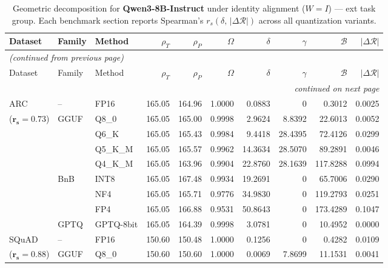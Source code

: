 \begingroup
\small
\setlength{\tabcolsep}{4pt}
\renewcommand{\arraystretch}{1.05}
\setlength{\LTcapwidth}{\textwidth}
\begin{longtable}{ll l rrrrrrr}
\caption{Geometric decomposition for \textbf{Qwen3-8B-Instruct} under identity alignment ($W{=}I$) --- ext task group. Each benchmark section reports Spearman's $r_s(\delta,\,|\Delta\mathcal{R}|)$ across all quantization variants.}\label{tab:qwen_instruct_decomposition_ext}\\
\toprule
Dataset & Family & Method & $\rho_T$ & $\rho_P$ & $\Omega$ & $\delta$ & $\gamma$ & $\mathcal{B}$ & $|\Delta\mathcal{R}|$ \\
\midrule
\endfirsthead
\multicolumn{10}{l}{\small\itshape (continued from previous page)}\\
\toprule
Dataset & Family & Method & $\rho_T$ & $\rho_P$ & $\Omega$ & $\delta$ & $\gamma$ & $\mathcal{B}$ & $|\Delta\mathcal{R}|$ \\
\midrule
\endhead
\midrule
\multicolumn{10}{r}{\small\itshape continued on next page}\\
\endfoot
\bottomrule
\endlastfoot
ARC & -- & FP16 & 165.05 & 164.96 & 1.0000 & 0.0883 & \cellcolor{cyan!12} $0$ & 0.3012 & 0.0025 \\
{\small ($\mathbf{r_s{=}0.73}$)} & GGUF & Q8\_0 & 165.05 & 165.00 & 0.9998 & 2.9624 & 8.8392 & 22.6013 & 0.0052 \\
 &  & Q6\_K & 165.05 & 165.43 & 0.9984 & 9.4418 & 28.4395 & 72.4126 & 0.0299 \\
 &  & Q5\_K\_M & 165.05 & 165.57 & 0.9962 & 14.3634 & 28.5070 & 89.2891 & 0.0046 \\
 &  & Q4\_K\_M & 165.05 & 163.96 & 0.9904 & 22.8760 & 28.1639 & 117.8288 & 0.0994 \\
 & BnB & INT8 & 165.05 & 167.48 & 0.9934 & 19.2691 & \cellcolor{cyan!12} $0$ & 65.7006 & 0.0290 \\
 &  & NF4 & 165.05 & 165.71 & 0.9776 & 34.9830 & \cellcolor{cyan!12} $0$ & 119.2793 & 0.0251 \\
 &  & FP4 & 165.05 & 166.88 & 0.9531 & 50.8643 & \cellcolor{cyan!12} $0$ & 173.4289 & 0.1047 \\
 & GPTQ & GPTQ-8bit & 165.05 & 164.39 & 0.9998 & 3.0781 & \cellcolor{cyan!12} $0$ & 10.4952 & 0.0000 \\
\midrule
SQuAD & -- & FP16 & 150.60 & 150.48 & 1.0000 & 0.1256 & \cellcolor{cyan!12} $0$ & 0.4282 & 0.0109 \\
{\small ($\mathbf{r_s{=}0.88}$)} & GGUF & Q8\_0 & 150.60 & 150.60 & 1.0000 & 0.0069 & 7.8699 & 11.1531 & 0.0041 \\

\end{longtable}

